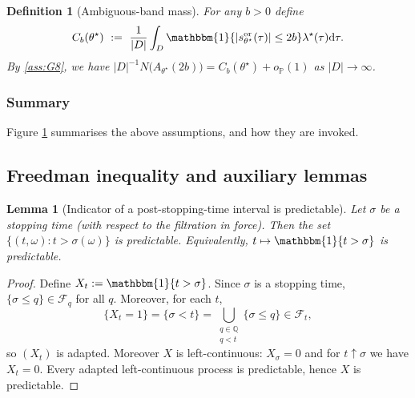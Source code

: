\documentclass{statsoc}
\newtheorem{lemma}[lemma]{Lemma}
\newtheorem{definition}[definition]{Definition}
\newcommand{\dd}{\mathrm{d}}
\newcommand{\1}{\mathbbm{1}}
\begin{document}
\begin{definition}[Ambiguous-band mass]\label{def:C_b}
For any $b>0$ define
\[
C_b(\theta^\star)\ :=\ \frac{1}{|D|}\int_D \1\{|s_{\theta^\star}^{\rm or}(\tau)|\le 2b\} \lambda^\star(\tau) \dd\tau.
\]
By \cref{ass:G8}, we have $|D|^{-1}N\!\big(A_{\theta^\star}(2b)\big)=C_b(\theta^\star)+o_{\mathbb P}(1)$ as $|D|\to\infty$.
\end{definition}

\subsubsection{Summary}

Figure \ref{fig:assDAG} summarises the above assumptions, and how they are invoked.


\begin{figure}[omitted: a diagram of this paper's results, not reproduced here]\label{fig:assDAG}\end{figure}
\break

\subsection{Freedman inequality and auxiliary lemmas}\label{sec:freedman}

\begin{lemma}[Indicator of a post-stopping-time interval is predictable]\label{lem:predictable-stoptime}
Let $\sigma$ be a stopping time (with respect to the filtration in force). Then the set $\{(t,\omega):t>\sigma(\omega)\}$ is predictable. Equivalently, $t\mapsto \1\{t>\sigma\}$ is predictable.
\end{lemma}

\begin{proof}
Define $X_t:=\1\{t>\sigma\}$. Since $\sigma$ is a stopping time, $\{\sigma\le q\}\in\mathcal F_q$ for all $q$.
Moreover, for each $t$,
\[
\{X_t=1\}=\{\sigma<t\}=\bigcup_{\substack{q\in\mathbb Q\\ q<t}}\{\sigma\le q\}\in\mathcal F_t,
\]
so $(X_t)$ is adapted. Moreover $X$ is left-continuous: $X_\sigma=0$ and for $t\uparrow\sigma$ we have $X_t=0$. Every adapted left-continuous process is predictable, hence $X$ is predictable.
\end{proof}
\end{document}
